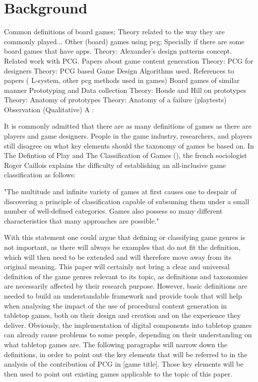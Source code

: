 \section{Background}
Common definitions of board games; Theory related to the way they are commonly played...
Other (board) games using pcg; Specially if there are some board games that have apps. 
Theory: Alexander's design patterns concept.
Related work with PCG.
Papers about game content generation
Theory: PCG for designers
Theory: PCG based Game Design
Algorithms used.
References to papers ( L-system, other pcg methods used in games)
Board games of similar manner
Prototyping and Data collection 
Theory: Houde and Hill on prototypes
Theory: Anatomy of prototypes
Theory: Anatomy of a failure (playtests)
Observation (Qualitative)
A :

It is commonly admitted that there are as many definitions of games as there are players and game designers. People in the game industry, researchers, and players still disagree on what key elements should the taxonomy of games be based on. In The Defintion of Play and The Classification of Games (), the french sociologist Roger Caillois explains the difficulty of establishing an all-inclusive game classification as follows:

"The multitude and infinite variety of games at first causes one to despair of discovering a principle of classification capable of subsuming them under a small number of well-defined categories. Games also possess so many different characteristics that many approaches are possible."

With this statement one could argue that defining or classifying game genres is not important, as there will always be examples that do not fit the definition, which will then need to be extended and will therefore move away from its original meaning. This paper will certainly not bring a clear and universal definition of the game genres relevant to its topic, as definitions and taxonomies are necessarily affected by their research purpose. However, basic definitions are needed to build an understandable framework and provide tools that will help when analysing the impact of the use of procedural content generation in tabletop games, both on their design and creation and on the experience they deliver.
Obviously, the implementation of digital components into tabletop games can already cause problems to some people, depending on their understanding on what tabletop games are. The following paragraphs will narrow down the definitions, in order to point out the key elements that will be referred to in the analysis of the contribution of PCG in [game title]. Those key elements will be then used to point out existing games applicable to the topic of this paper.

